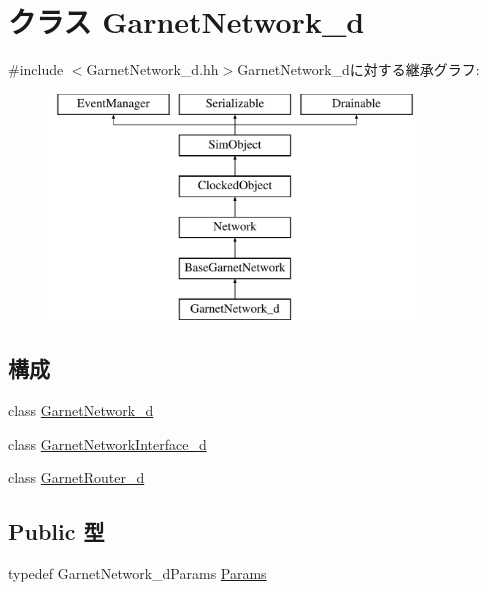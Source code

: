 \hypertarget{classGarnetNetwork__d}{
\section{クラス GarnetNetwork\_\-d}
\label{classGarnetNetwork__d}
}


{\ttfamily \#include $<$GarnetNetwork\_\-d.hh$>$}GarnetNetwork\_\-dに対する継承グラフ:\begin{figure}[H]
\begin{center}
\leavevmode
\includegraphics[height=6cm]{classGarnetNetwork__d}
\end{center}
\end{figure}
\subsection*{構成}
\begin{DoxyCompactItemize}
\item 
class \hyperlink{classGarnetNetwork__d_1_1GarnetNetwork__d}{GarnetNetwork\_\-d}
\item 
class \hyperlink{classGarnetNetwork__d_1_1GarnetNetworkInterface__d}{GarnetNetworkInterface\_\-d}
\item 
class \hyperlink{classGarnetNetwork__d_1_1GarnetRouter__d}{GarnetRouter\_\-d}
\end{DoxyCompactItemize}
\subsection*{Public 型}
\begin{DoxyCompactItemize}
\item 
typedef GarnetNetwork\_\-dParams \hyperlink{classGarnetNetwork__d_aa723bef17ce7ec9b7c3ad12002aef3bb}{Params}
\end{DoxyCompactItemize}
